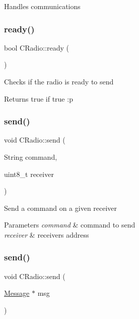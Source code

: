 Handles communications \mbox{\label{class_c_radio_a62592f6755cf03360b432a3b09d9ad65}} 
\subsubsection{\texorpdfstring{ready()}{ready()}}
{\footnotesize\ttfamily bool C\+Radio\+::ready (\begin{DoxyParamCaption}{ }\end{DoxyParamCaption})}

Checks if the radio is ready to send \begin{DoxyReturn}{Returns}
true if true \+:p 
\end{DoxyReturn}
\mbox{\label{class_c_radio_aff4eca6c6d1255abe0b005c9cfdacb0a}} 
\subsubsection{\texorpdfstring{send()}{send()}\hspace{0.1cm}{\footnotesize\ttfamily [1/2]}}
{\footnotesize\ttfamily void C\+Radio\+::send (\begin{DoxyParamCaption}\item[{String}]{command,  }\item[{uint8\+\_\+t}]{receiver }\end{DoxyParamCaption})}

Send a command on a given receiver 
\begin{DoxyParams}{Parameters}
{\em command} & command to send \\
\hline
{\em receiver} & receiver\textquotesingle{}s address \\
\hline
\end{DoxyParams}
\mbox{\label{class_c_radio_a46248b500efa212ed50f2896a877c421}} 
\subsubsection{\texorpdfstring{send()}{send()}\hspace{0.1cm}{\footnotesize\ttfamily [2/2]}}
{\footnotesize\ttfamily void C\+Radio\+::send (\begin{DoxyParamCaption}\item[{\hyperlink{class_message}{Message} $\ast$}]{msg }\end{DoxyParamCaption})}

